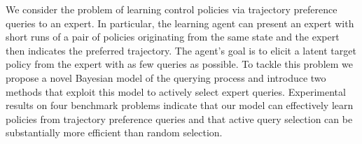 
We consider the problem of learning control policies via trajectory preference queries to an expert. In particular, the learning agent can present an expert with short runs of a pair of policies originating from the same state and the expert then indicates the preferred trajectory. The agent's goal is to elicit a latent target policy from the expert with as few queries as possible. To tackle this problem we propose a novel Bayesian model of the querying process and introduce two methods that exploit this model to actively select expert queries. Experimental results on four benchmark problems indicate that our model can effectively learn policies from trajectory preference queries and that active query selection can be substantially more efficient than random selection.


